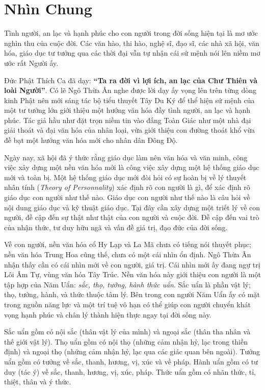 \chapter{Nhìn Chung} %
\label{cha:nhin_chung}

Tình người, an lạc và hạnh phúc cho con người trong đời sống hiện tại là mơ ước nghìn thu của cuộc đời. Các văn hào, thi hào, nghệ sĩ, đạo sĩ, các nhà xã hội, văn hóa, giáo dục tư tưởng qua các thời đại vẫn tự nhận cái sứ mệnh nói lên niềm mơ ước rất Người ấy.

Đức Phật Thích Ca đã dạy: {\bf ``Ta ra đời vì lợi ích, an lạc của Chư Thiên và loài Người''}. Có lẽ Ngô Thừa Ân nghe được lời dạy ấy vọng lên trên từng dòng kinh Phật nên mới sáng tác bộ tiểu thuyết Tây Du Ký để thể hiện sứ mệnh của một tư tưởng lớn giới thiệu một hướng văn hóa đầy tình người, an lạc và hạnh phúc. Tác giả hầu như đặt trọn niềm tin vào đấng Toàn Giác như một nhà đại giải thoát và đại văn hóa của nhân loại, vừa giới thiệu con đường thoát khổ vừa đề bạt một hướng văn hóa mới cho nhân dân Đông Độ.

Ngày nay, xã hội đã ý thức rằng giáo dục làm nên văn hóa và văn minh, công việc xây dựng một nền văn hóa mới là công việc xây dựng một hệ thống giáo dục mới và toàn bị. Một hệ thống giáo dục mới đòi hỏi có sự hoàn bị về lý thuyết nhân tính (\emph{Theory of Personnality}) xác định rõ con người là gì, để xác định rõ giáo dục con người như thế nào. Giáo dục con người như thế nào là câu hỏi về nội dung giáo dục và kỹ thuật giáo dục. Tại đây cần xây dựng một triết lý về con người, đề cập đến sự thật như thật của con người và cuộc đời. Đề cập đến vai trò của nhận thức, tư duy hữu ngã và vấn đề giá trị, đạo đức của đời sống.

Về con người, nền văn hóa cổ Hy Lạp và La Mã chưa có tiếng nói thuyết phục; nền văn hóa Trung Hoa cũng thế, chưa có một cái nhìn ổn định. Ngô Thừa Ân nhận thấy cần có cái nhìn mới về con người, giá trị. Cái nhìn mới ấy đang ngự trị Lôi Âm Tự, vùng văn hóa Tây Trúc. Nền văn hóa này giới thiệu con người là một tập hợp của Năm Uẩn: \emph{sắc, thọ, tưởng, hành thức uẩn}. Sắc uẩn là phần vật lý; thọ, tưởng, hành, và thức thuộc tâm lý. Bên trong con người Năm Uẩn ấy có mặt trong nguồn năng lực và một trí tuệ vô hạn có thể giúp con người chuyển khát vọng hạnh phúc và chân lý thành hiện thực ngay tại đời sống này.

Sắc uẩn gồm có nội sắc (thân vật lý của mình) và ngoại sắc (thân tha nhân và thế giới vật lý). Thọ uẩn gồm có nội thọ (những cảm nhận hỷ, lạc trong thiền định) và ngoại thọ (những cảm nhận hỷ, lạc qua các giác quan bên ngoài). Tưởng uẩn gồm có tưởng về sắc, thanh, hương, vị, xúc và về pháp. Hành uẩn gồm có tư duy (tác ý) về sắc, thanh, hương, vị, xúc, pháp. Thức uẩn gồm có nhãn thức, tỉ, thiệt, thân và ý thức.

